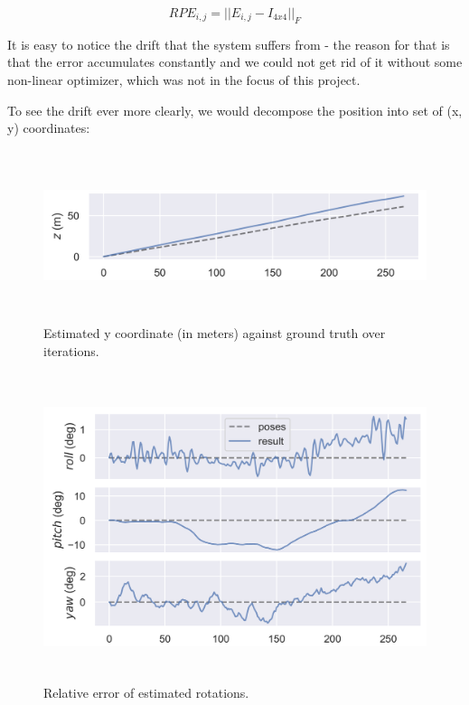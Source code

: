 \begin{equation}
    RPE_{i, j} = ||E_{i, j} - I_{4 x 4}||_{F}
\end{equation}

It is easy to notice the drift that the system suffers from - the reason for that is that the error accumulates constantly and we could not get rid of it without some non-linear optimizer, which was not in the focus of this project.

To see the drift ever more clearly, we would decompose the position into set of (x, y) coordinates:

\begin{figure}[h]
\caption{Estimated y coordinate (in meters) against ground truth over iterations.}
\includegraphics[height=5cm, width=15cm]{results/y_coord_over_time.png}
\end{figure}

\begin{figure}[!htb]
\caption{Relative error of estimated rotations.}
\includegraphics[height=9cm, width=15cm]{results/rotation.png}
\end{figure}


